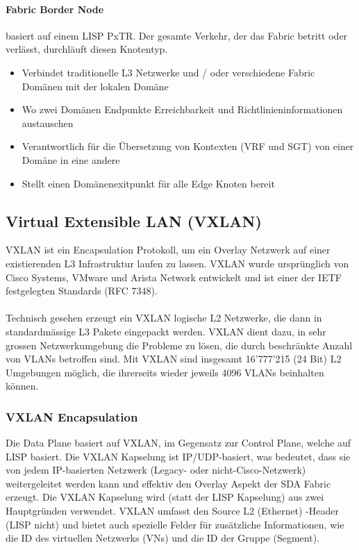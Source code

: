\paragraph{Fabric Border Node} basiert auf einem LISP PxTR. Der gesamte Verkehr, der das Fabric betritt oder verlässt, durchläuft diesen Knotentyp.
\begin{itemize}
	\item Verbindet traditionelle L3 Netzwerke und / oder verschiedene Fabric Domänen mit der lokalen Domäne
	\item Wo zwei Domänen Endpunkte Erreichbarkeit und Richtlinieninformationen austauschen
	\item Verantwortlich für die Übersetzung von Kontexten (VRF und SGT) von einer Domäne in eine andere
	\item Stellt einen Domänenexitpunkt für alle Edge Knoten bereit
\end{itemize}

\subsection{Virtual Extensible LAN (VXLAN)}
VXLAN ist ein Encapsulation Protokoll, um ein Overlay Netzwerk auf einer existierenden L3 Infrastruktur laufen zu lassen. VXLAN wurde ursprünglich von Cisco Systems, VMware und Arista Network entwickelt und ist einer der IETF festgelegten Standards (RFC 7348). \cite{rfc-7348} \\
\\
Technisch gesehen erzeugt ein VXLAN logische L2 Netzwerke, die dann in standardmässige L3 Pakete eingepackt werden. VXLAN dient dazu, in sehr grossen Netzwerkumgebung die Probleme zu lösen, die durch beschränkte Anzahl von VLANs betroffen sind. Mit VXLAN sind insgesamt 16’777’215 (24 Bit) L2 Umgebungen möglich, die ihrerseits wieder jeweils 4096 VLANs beinhalten können. 

\subsubsection{VXLAN Encapsulation}
Die Data Plane basiert auf VXLAN, im Gegensatz zur Control Plane, welche auf LISP basiert. Die VXLAN Kapselung ist IP/UDP-basiert, was bedeutet, dass sie von jedem IP-basierten Netzwerk (Legacy- oder nicht-Cisco-Netzwerk) weitergeleitet werden kann und effektiv den Overlay Aspekt der SDA Fabric erzeugt. Die VXLAN Kapselung wird (statt der LISP Kapselung) aus zwei Hauptgründen verwendet. VXLAN umfasst den Source L2 (Ethernet) -Header (LISP nicht) und bietet auch spezielle Felder für zusätzliche Informationen, wie die ID des virtuellen Netzwerks (VNs) und die ID der Gruppe (Segment). \cite{sda-whitepaper}\\

